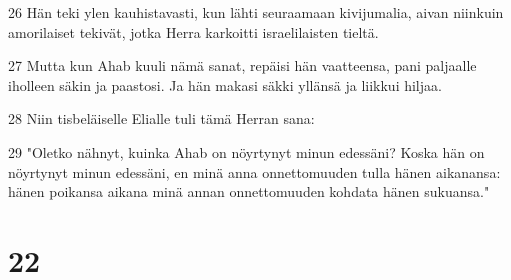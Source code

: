 \par 26 Hän teki ylen kauhistavasti, kun lähti seuraamaan kivijumalia, aivan niinkuin amorilaiset tekivät, jotka Herra karkoitti israelilaisten tieltä.
\par 27 Mutta kun Ahab kuuli nämä sanat, repäisi hän vaatteensa, pani paljaalle iholleen säkin ja paastosi. Ja hän makasi säkki yllänsä ja liikkui hiljaa.
\par 28 Niin tisbeläiselle Elialle tuli tämä Herran sana:
\par 29 "Oletko nähnyt, kuinka Ahab on nöyrtynyt minun edessäni? Koska hän on nöyrtynyt minun edessäni, en minä anna onnettomuuden tulla hänen aikanansa: hänen poikansa aikana minä annan onnettomuuden kohdata hänen sukuansa."

\chapter{22}

